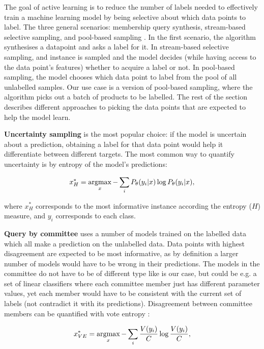 The goal of active learning is to reduce the number of labels needed  to effectively train a machine learning model by  being selective about which data points to label.
The three general scenarios: membership query synthesis, stream-based selective sampling, and pool-based sampling \cite{al_survey}.
In the first scenario, the algorithm synthesises a datapoint and asks a label for it.
In stream-based selective sampling, and instance is sampled and  the model decides (while having access to the data point's features) whether to acquire a label or not.
In pool-based sampling, the model chooses which data point to label from the pool of all unlabelled samples.
Our use case is a version of pool-based sampling, where the algorithm picks out a batch of products to be labelled.
The rest of the section describes different approaches to picking the data points that are expected to help the model learn.

\textbf{Uncertainty sampling} is the most popular choice: if the model is uncertain about a prediction, obtaining a label for that data point would help it differentiate between different targets.
The most common way to quantify uncertainty is by entropy of the model's predictions:

\begin{equation}
 x^*_H = \operatorname*{argmax}_x - \sum_{i} P_\theta(y_i|x) \log P_\theta(y_i|x),
\end{equation}

where $x^*_H$ corresponds to the most informative instance according the entropy ($H$) measure, and $y_i$ corresponds to each class.

\textbf{Query by committee} uses a number of models trained on the labelled data which all make a prediction on the unlabelled data.
Data points with highest disagreement are expected to be most informative, as by definition a larger number of models would have to be wrong in their predictions.
The models in the committee do not have to be of different type like is our case, but could be e.g. a set of linear classifiers where each committee member just has different parameter values, yet each member would have to be consistent with the current set of labels (not contradict it with its predictions).
Disagreement between committee members can be quantified with vote entropy \cite{vote_entropy}:

\begin{equation}
 x^*_{VE} = \operatorname*{argmax}_x - \sum_{i} \frac{V(y_i)}{C}  \log \frac{V(y_i)}{C},
\end{equation}

